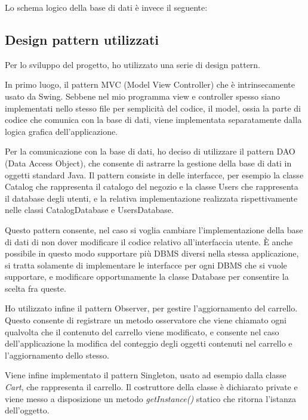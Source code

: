 \documentclass{article}
\begin{document}
Lo schema logico della base di dati è invece il seguente:

\subsection{Design pattern utilizzati}
Per lo sviluppo del progetto, ho utilizzato una serie di design pattern.

In primo luogo, il pattern MVC (Model View Controller) che è intrinsecamente usato da Swing. Sebbene nel mio programma view e controller
spesso siano implementati nello stesso file per semplicità del codice, il model, ossia la parte di codice che comunica con la base di 
dati, viene implementata separatamente dalla logica grafica dell'applicazione. 

Per la comunicazione con la base di dati, ho deciso di utilizzare il pattern DAO (Data Access Object), che consente di astrarre la
gestione della base di dati in oggetti standard Java. Il pattern consiste in delle interfacce, per esempio la classe Catalog che
rappresenta il catalogo del negozio e la classe Users che rappresenta il database degli utenti, e la relativa implementazione realizzata 
rispettivamente nelle classi CatalogDatabase e UsersDatabase. 

Questo pattern consente, nel caso si voglia cambiare l'implementazione della base di dati di non dover modificare il codice relativo 
all'interfaccia utente. È anche possibile in questo modo supportare più DBMS diversi nella stessa applicazione, si tratta solamente di 
implementare le interfacce per ogni DBMS che si vuole supportare, e modificare opportunamente la classe Database per consentire la 
scelta fra queste. 

Ho utilizzato infine il pattern Observer, per gestire l'aggiornamento del carrello. Questo consente di registrare un metodo osservatore
che viene chiamato ogni qualvolta che il contenuto del carrello viene modificato, e consente nel caso dell'applicazione la modifica del
conteggio degli oggetti contenuti nel carrello e l'aggiornamento dello stesso. 

Viene infine implementato il pattern Singleton, usato ad esempio dalla classe \textit{Cart}, che rappresenta il carrello. 
Il costruttore della classe è dichiarato private e viene messo a disposizione un metodo \textit{getInstance()} statico 
che ritorna l'istanza dell'oggetto.  

\end{document}
